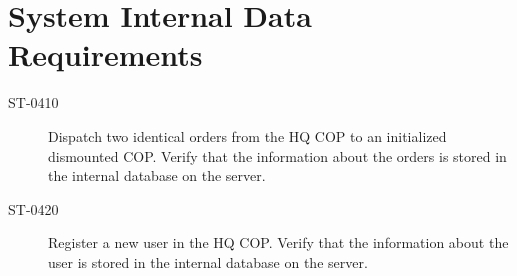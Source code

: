 \section{System Internal Data Requirements}

\begin{description}
\item[ST-0410]	Dispatch two identical orders from the HQ COP to an initialized dismounted COP. Verify that the information about the orders is stored in the internal database on the server.
\item[ST-0420] Register a new user in the HQ COP. Verify that the information about the user is stored in the internal database on the server.
\end{description}